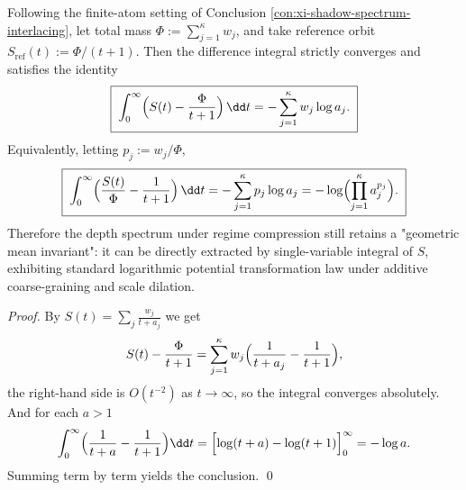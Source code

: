 \begin{proposition}\label{prop:xi-logpotential-integral-geomean}
Following the finite-atom setting of Conclusion \ref{con:xi-shadow-spectrum-interlacing}, let total mass \(\Phi:=\sum_{j=1}^{\kappa}w_j\), and take reference orbit
\(
S_{\mathrm{ref}}(t):=\Phi/(t+1)
\).
Then the difference integral strictly converges and satisfies the identity
\[
\boxed{\;
\int_{0}^{\infty}\Bigl(S(t)-\frac{\Phi}{t+1}\Bigr)\,\dd t
=-\sum_{j=1}^{\kappa}w_j\log a_j.\;}
\]
Equivalently, letting \(p_j:=w_j/\Phi\),
\[
\boxed{\;
\int_{0}^{\infty}\Bigl(\frac{S(t)}{\Phi}-\frac{1}{t+1}\Bigr)\,\dd t
=-\sum_{j=1}^{\kappa}p_j\log a_j
=-\log\Bigl(\prod_{j=1}^{\kappa}a_j^{p_j}\Bigr).\;}
\]
Therefore the depth spectrum under regime compression still retains a "geometric mean invariant": it can be directly extracted by single-variable integral of \(S\), exhibiting standard logarithmic potential transformation law under additive coarse-graining and scale dilation.
\end{proposition}
\begin{proof}
By \(S(t)=\sum_j\frac{w_j}{t+a_j}\) we get
\[
S(t)-\frac{\Phi}{t+1}
=\sum_{j=1}^{\kappa}w_j\Bigl(\frac{1}{t+a_j}-\frac{1}{t+1}\Bigr),
\]
the right-hand side is \(O(t^{-2})\) as \(t\to\infty\), so the integral converges absolutely.
And for each \(a>1\)
\[
\int_0^\infty\Bigl(\frac{1}{t+a}-\frac{1}{t+1}\Bigr)\dd t
=\Bigl[\log(t+a)-\log(t+1)\Bigr]_{0}^{\infty}
=-\log a.
\]
Summing term by term yields the conclusion. \qed
\end{proof}

